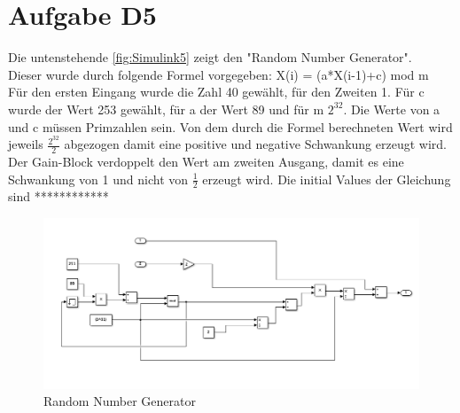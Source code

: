 
\chapter{Aufgabe D5}
Die untenstehende \autoref{fig:Simulink5} zeigt den "Random Number Generator". \\
Dieser wurde durch folgende Formel vorgegeben: X(i) = (a*X(i-1)+c) mod m\\
Für den ersten Eingang wurde die Zahl 40 gewählt, für den Zweiten 1.
Für c wurde der Wert 253 gewählt, für a der Wert 89 und für m $2^{32}$. Die Werte von a und c müssen Primzahlen sein. Von dem durch die Formel berechneten Wert wird jeweils $\frac{2^{32}}{2}$ abgezogen damit eine positive und negative Schwankung erzeugt wird. Der Gain-Block verdoppelt den Wert am zweiten Ausgang, damit es eine Schwankung von 1 und nicht von $\frac{1}{2}$ erzeugt wird.
Die initial Values der Gleichung sind ************

\begin{figure}[h!]
	\centering
	\includegraphics[width=1\linewidth]{../Graphiken/Simulink5}
	\caption{Random Number Generator}
	\label{fig:Simulink5}
\end{figure}